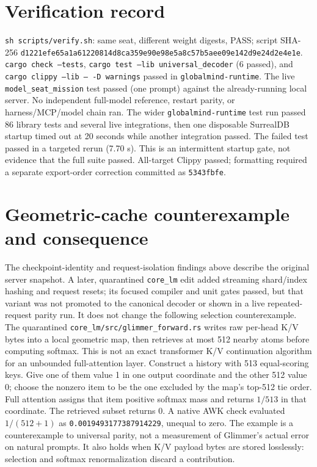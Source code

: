 \documentclass{article}
\begin{document}
\section*{Verification record}
\texttt{sh scripts/verify.sh}: same seat, different weight digests, PASS;
script SHA-256 \texttt{d1221efe65a1a61220814d8ca359e90e98e5a8c57b5aee09e142d9e24d2e4e1e}.
\texttt{cargo check --tests}, \texttt{cargo test --lib universal\_decoder}
(6 passed), and \texttt{cargo clippy --lib -- -D warnings} passed in
\texttt{globalmind-runtime}. The live \texttt{model\_seat\_mission} test
passed (one prompt) against the already-running local server. No independent
full-model reference, restart parity, or harness/MCP/model chain ran.
The wider \texttt{globalmind-runtime} test run passed 86 library tests and
several live integrations, then one disposable SurrealDB startup timed out
at 20 seconds while another integration passed. The failed test passed in a
targeted rerun (7.70 s). This is an intermittent startup gate, not evidence
that the full suite passed. All-target Clippy passed; formatting required a
separate export-order correction committed as \texttt{5343fbfe}.

\section*{Geometric-cache counterexample and consequence}
The checkpoint-identity and request-isolation findings above describe the
original server snapshot. A later, quarantined \texttt{core\_lm} edit added
streaming shard/index hashing and request resets; its focused compiler and
unit gates passed, but that variant was not promoted to the canonical
decoder or shown in a live repeated-request parity run. It does not change
the following selection counterexample.
The quarantined \texttt{core\_lm/src/glimmer\_forward.rs} writes raw per-head
K/V bytes into a local geometric map, then retrieves at most 512 nearby atoms
before computing softmax. This is not an exact transformer K/V continuation
algorithm for an unbounded full-attention layer. Construct a history with
513 equal-scoring keys. Give one of them value 1 in one output coordinate
and the other 512 value 0; choose the nonzero item to be the one excluded
by the map's top-512 tie order. Full attention assigns that item positive
softmax mass and returns $1/513$ in that coordinate. The retrieved subset
returns 0. A native AWK check evaluated $1/(512+1)$ as
\texttt{0.0019493177387914229}, unequal to zero. The example is a
counterexample to universal parity, not a measurement of Glimmer's actual
error on natural prompts. It also holds when K/V payload bytes are stored
losslessly: selection and softmax renormalization discard a contribution.
\end{document}
